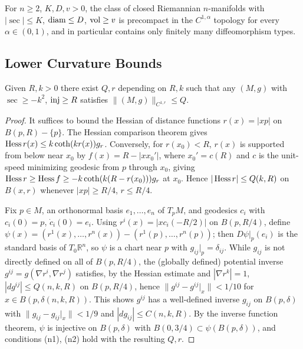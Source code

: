 \begin{corollary}
  \label{cor:pet-ch11-cheeger-diam-vol-finiteness}
  For $n\ge2$, $K,D,v>0$, the class of closed Riemannian $n$-manifolds with
  $|\sec|\le K$, $\operatorname{diam}\le D$, $\operatorname{vol}\ge v$ is precompact in the $C^{1,\alpha}$
  topology for every $\alpha\in(0,1)$, and in particular contains only
  finitely many diffeomorphism types.
\end{corollary}

\subsection{Lower Curvature Bounds}

\begin{theorem}
  \label{thm:pet-ch11-lower-sec-bound-injectivity-norm-control}
  Given $R,k>0$ there exist $Q,r$ depending on $R,k$ such that any $(M,g)$
  with $\sec\ge-k^2$, $\operatorname{inj}\ge R$ satisfies $\|(M,g)\|_{C^{1,r}}\le Q$.
\end{theorem}
\begin{proof}
  It suffices to bound the Hessian of distance functions $r(x)=|xp|$ on
  $B(p,R)-\{p\}$. The Hessian comparison theorem gives
  $\operatorname{Hess} r(x)\le k\coth(kr(x))g_r$. Conversely, for $r(x_0)<R$, $r(x)$ is
  supported from below near $x_0$ by $f(x)=R-|xx_0'|$, where $x_0'=c(R)$ and
  $c$ is the unit-speed minimizing geodesic from $p$ through $x_0$, giving
  $\operatorname{Hess} r\ge\operatorname{Hess} f\ge-k\coth(k(R-r(x_0)))g_r$ at $x_0$. Hence
  $|\operatorname{Hess} r|\le Q(k,R)$ on $B(x,r)$ whenever $|xp|\ge R/4$, $r\le R/4$.

  Fix $p\in M$, an orthonormal basis $e_1,\dots,e_n$ of $T_pM$, and geodesics
  $c_i$ with $c_i(0)=p$, $\dot c_i(0)=e_i$. Using
  $r^i(x)=|xc_i(-R/2)|$ on $B(p,R/4)$, define
  $\psi(x)=(r^1(x),\dots,r^n(x))-(r^1(p),\dots,r^n(p))$; then
  $D\psi|_p(e_i)$ is the standard basis of $T_0\mathbb{R}^n$, so $\psi$ is a
  chart near $p$ with $g_{ij}|_p=\delta_{ij}$. While $g_{ij}$ is not directly
  defined on all of $B(p,R/4)$, the (globally defined) potential inverse
  $g^{ij}=g(\nabla r^i,\nabla r^j)$ satisfies, by the Hessian estimate and
  $|\nabla r^k|=1$, $|dg^{ij}|\le Q(n,k,R)$ on $B(p,R/4)$, hence
  $\|g^{ij}-g^{ij}|_x\|<1/10$ for $x\in B(p,\delta(n,k,R))$. This shows
  $g^{ij}$ has a well-defined inverse $g_{ij}$ on $B(p,\delta)$ with
  $\|g_{ij}-g_{ij}|_x\|<1/9$ and $|dg_{ij}|\le C(n,k,R)$. By the inverse
  function theorem, $\psi$ is injective on $B(p,\delta)$ with
  $B(0,3/4)\subset\psi(B(p,\delta))$, and conditions (n1), (n2) hold with the
  resulting $Q,r$.
\end{proof}

